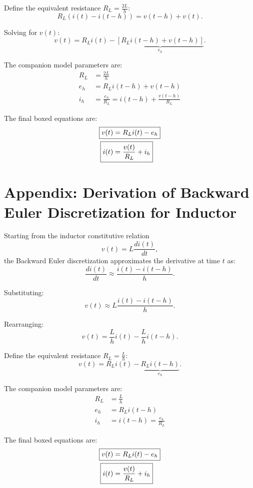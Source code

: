 Define the equivalent resistance $R_L = \frac{2L}{h}$:
\begin{equation}
    R_L \left( i(t) - i(t-h) \right) = v(t-h) + v(t).
\end{equation}

Solving for $v(t)$:
\begin{equation}
    v(t) = R_L i(t) - \underbrace{\left[ R_L i(t-h) + v(t-h) \right]}_{e_h}.
\end{equation}

The companion model parameters are:
\begin{align}
    R_L &= \frac{2L}{h} \\
    e_h &= R_L i(t-h) + v(t-h) \\
    i_h &= \frac{e_h}{R_L} = i(t-h) + \frac{v(t-h)}{R_L}
\end{align}

The final boxed equations are:
\begin{align}
    \Aboxed{v(t) &= R_L i(t) - e_h} \label{eq:vt_ind_trapz_app} \\
    \Aboxed{i(t) &= \frac{v(t)}{R_L} + i_h} \label{eq:it_ind_trapz_app}
\end{align}

\clearpage
\section{Appendix: Derivation of Backward Euler Discretization for Inductor} \label{sec:appendix_ind_be}

Starting from the inductor constitutive relation
\begin{equation}
    v(t) = L\frac{di(t)}{dt},
\end{equation}
the Backward Euler discretization approximates the derivative at time $t$ as:
\begin{equation}
    \frac{di(t)}{dt} \approx \frac{i(t) - i(t-h)}{h}.
\end{equation}

Substituting:
\begin{equation}
    v(t) \approx L \frac{i(t) - i(t-h)}{h}.
\end{equation}

Rearranging:
\begin{equation}
    v(t) = \frac{L}{h} i(t) - \frac{L}{h} i(t-h).
\end{equation}

Define the equivalent resistance $R_L = \frac{L}{h}$:
\begin{equation}
    v(t) = R_L i(t) - \underbrace{R_L i(t-h)}_{e_h}.
\end{equation}

The companion model parameters are:
\begin{align}
    R_L &= \frac{L}{h} \\
    e_h &= R_L i(t-h) \\
    i_h &= i(t-h) = \frac{e_h}{R_L}
\end{align}

The final boxed equations are:
\begin{align}
    \Aboxed{v(t) &= R_L i(t) - e_h} \label{eq:vt_ind_be_app} \\
    \Aboxed{i(t) &= \frac{v(t)}{R_L} + i_h} \label{eq:it_ind_be_app}
\end{align}